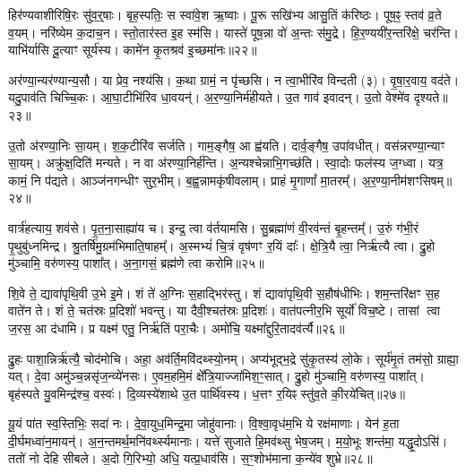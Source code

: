 हिर॑ण्यवाशीरिषि॒रः सु॑व॒र्॒षाः।
बृह॒स्पतिः॒ स स्वा॑वे॒श ऋ॒ष्वाः।
पू॒रू सखि॑भ्य आसु॒तिं क॑रिष्ठः।
पूष॒ꣴ॒ स्तव॑ व्र॒ते व॒यम्।
नरि॑ष्येम क॒दाच॒न।
स्तो॒तार॑स्त इ॒ह स्म॑सि।
यास्ते॑ पूष॒न्ना वो॑ अ॒न्तः स॑मु॒द्रे।
हि॒र॒ण्ययी॑र॒न्तरि॑क्षे॒ चर॑न्ति।
याभि॑र्यासि दू॒त्याꣳ सूर्य॑स्य।
कामे॑न कृ॒तश्रव॑ इ॒च्छमा॑नः॥२२॥\ip

अर॑ण्या॒न्यर॑ण्यान्य॒सौ।
या प्रेव॒ नश्य॑सि।
क॒था ग्रामं॒ न पृ॑च्छसि।
न त्वा॒भीरि॑व विन्दती (३)।
वृ॒षा॒र॒वाय॒ वद॑ते।
यदु॒पाव॑ति चिच्चि॒कः।
आ॒घा॒टीभि॑रिव धा॒वयन्॑।
अ॒र॒ण्या॒निर्म॑हीयते।
उ॒त गाव॑ इवादन्।
उ॒तो वेश्मे॑व दृश्यते॥२३॥\ip

उ॒तो अ॑रण्या॒निः सा॒यम्।
श॒क॒टीरि॑व सर्जति।
गाम॒ङ्गैष॒ आ ह्व॑यति।
दार्व॒ङ्गैष॒ उपा॑वधीत्।
वस॑न्नरण्या॒न्याꣳ सा॒यम्।
अक्रु॑क्ष॒दिति॑ मन्यते।
न वा अ॑रण्या॒निर्\mbox{}ह॑न्ति।
अ॒न्यश्चेन्नाभि॒गच्छ॑ति।
स्वा॒दोः फल॑स्य ज॒ग्ध्वा।
यत्र॒ कामं॒ नि प॑द्यते।
आञ्ज॑नगन्धीꣳ सुर॒भीम्।
ब॒ह्व॒न्नामकृ॑षीवलाम्।
प्राहं मृ॒गाणां᳚ मा॒तरम्᳚।
अ॒र॒ण्या॒नीम॑शꣳसिषम्॥२४॥\ip\anuvakamend[स्या॒म॒ रु॒रो॒ह॒ यु॒वा॒नः॒ शु॒न्ध्यूरि॒च्छमा॑नो दृश्यते॒ निप॑द्यते च॒त्वारि॑ च]

वार्त्र॑हत्याय॒ शव॑से।
पृ॒त॒ना॒साह्या॑य च।
इन्द्र॒ त्वा व॑र्तयामसि।
सु॒ब्रह्मा॑णं वी॒रव॑न्तं बृ॒हन्तम्᳚।
उ॒रुं ग॑भी॒रं पृ॒थुबु॑ध्नमिन्द्र।
श्रु॒तर्\mbox{}षि॑मु॒ग्रम॑भिमाति॒षाहम्᳚।
अ॒स्मभ्यं॑ चि॒त्रं वृष॑णꣳ र॒यिं दाः᳚।
क्षे॒त्रि॒यै त्वा॒ निर्\mbox{}ऋ॑त्यै त्वा।
द्रु॒हो मु॑ञ्चामि॒ वरु॑णस्य॒ पाशा᳚त्।
अ॒ना॒गसं॒ ब्रह्म॑णे त्वा करोमि॥२५॥\ip

शि॒वे ते॒ द्यावा॑पृथि॒वी उ॒भे इ॒मे।
शं ते॑ अ॒ग्निः स॒हाद्भिर॑स्तु।
शं द्यावा॑पृथि॒वी स॒हौष॑धीभिः।
शम॒न्तरि॑क्षꣳ स॒ह वाते॑न ते।
शं ते॒ चत॑स्रः प्र॒दिशो॑ भवन्तु।
या दैवी॒श्चत॑स्रः प्र॒दिशः॑।
वात॑पत्नीर॒भि सूर्यो॑ विच॒ष्टे।
तासां त्वा ज॒रस॒ आ द॑धामि।
प्र यक्ष्म॑ एतु॒ निर्\mbox{}ऋ॑तिं परा॒चैः।
अमो॑चि॒ यक्ष्मा᳚द्दुरि॒तादव॑र्त्यै॥२६॥\ip

द्रु॒हः पाशा॒न्निर्\mbox{}ऋ॑त्यै॒ चोद॑मोचि।
अहा॒ अव॑र्ति॒मवि॑दथ्स्यो॒नम्।
अप्य॑भूद्भ॒द्रे सु॑कृ॒तस्य॑ लो॒के।
सूर्य॑मृ॒तं तम॑सो॒ ग्राह्या॒ यत्।
दे॒वा अमु॑ञ्च॒न्नसृ॑ज॒न्व्ये॑नसः।
ए॒वम॒हमि॒मं क्षे᳚त्रि॒याज्जा॑मिश॒ꣳ॒सात्।
द्रु॒हो मु॑ञ्चामि॒ वरु॑णस्य॒ पाशा᳚त्।
बृह॑स्पते यु॒वमिन्द्र॑श्च॒ वस्वः॑।
दि॒व्यस्ये॑शाथे उ॒त पार्थि॑वस्य।
ध॒त्तꣳ र॒यिꣴ स्तु॑व॒ते की॒रये॑चित्॥२७॥\ip

यू॒यं पा॑त स्व॒स्तिभिः॒ सदा॑ नः।
दे॒वा॒युध॒मिन्द्र॒मा जोहु॑वानाः।
वि॒श्वा॒वृध॑म॒भि ये रक्ष॑माणाः।
येन॑ ह॒ता दी॒र्घमध्वा॑न॒मायन्॑।
अ॒न॒न्तमर्थ॒मनि॑वर्थ्स्यमानाः।
यत्ते॑ सुजाते हि॒मव॑थ्सु भेष॒जम्।
म॒यो॒भूः शन्त॑मा॒ यद्धृ॒दो\-ऽसि॑।
ततो॑ नो देहि सीबले।
अ॒दो गि॒रिभ्यो॒ अधि॒ यत्प्र॒धाव॑सि।
स॒ꣳ॒शोभ॑माना क॒न्ये॑व शुभ्रे॥२८॥\ip

